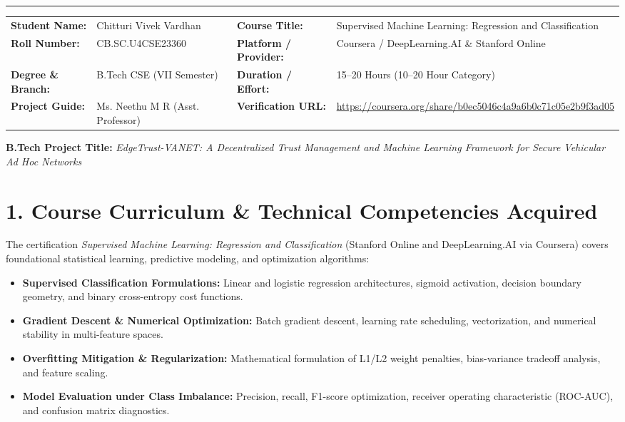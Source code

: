 \documentclass[10pt,a4paper]{article}
\begin{document}
\vspace{-4pt}
\hrule height 0.8pt
\vspace{4pt}

\noindent
\begin{tabularx}{\textwidth}{@{}l X l X@{}}
    \textbf{Student Name:} & Chitturi Vivek Vardhan & \textbf{Course Title:} & Supervised Machine Learning: Regression and Classification \\
    \textbf{Roll Number:} & CB.SC.U4CSE23360 & \textbf{Platform / Provider:} & Coursera / DeepLearning.AI \& Stanford Online \\
    \textbf{Degree \& Branch:} & B.Tech CSE (VII Semester) & \textbf{Duration / Effort:} & 15--20 Hours (10--20 Hour Category) \\
    \textbf{Project Guide:} & Ms. Neethu M R (Asst. Professor) & \textbf{Verification URL:} & \url{https://coursera.org/share/b0ec5046c4a9a6b0c71c05e2b9f3ad05} \\
\end{tabularx}

\vspace{3pt}
\noindent
\textbf{B.Tech Project Title:} \textit{EdgeTrust-VANET: A Decentralized Trust Management and Machine Learning Framework for Secure Vehicular Ad Hoc Networks}

\vspace{2pt}
\section*{1. Course Curriculum \& Technical Competencies Acquired}
The certification \textit{Supervised Machine Learning: Regression and Classification} (Stanford Online and DeepLearning.AI via Coursera) covers foundational statistical learning, predictive modeling, and optimization algorithms:
\begin{itemize}
    \item \textbf{Supervised Classification Formulations:} Linear and logistic regression architectures, sigmoid activation, decision boundary geometry, and binary cross-entropy cost functions.
    \item \textbf{Gradient Descent \& Numerical Optimization:} Batch gradient descent, learning rate scheduling, vectorization, and numerical stability in multi-feature spaces.
    \item \textbf{Overfitting Mitigation \& Regularization:} Mathematical formulation of L1/L2 weight penalties, bias-variance tradeoff analysis, and feature scaling.
    \item \textbf{Model Evaluation under Class Imbalance:} Precision, recall, F1-score optimization, receiver operating characteristic (ROC-AUC), and confusion matrix diagnostics.
\end{itemize}
\end{document}
